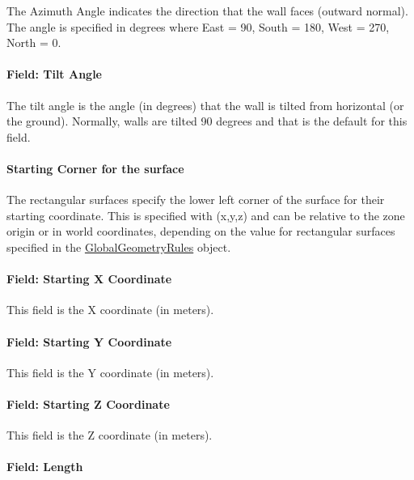 The Azimuth Angle indicates the direction that the wall faces (outward normal). The angle is specified in degrees where East = 90, South = 180, West = 270, North = 0.

\paragraph{Field: Tilt Angle}\label{field-tilt-angle-2}

The tilt angle is the angle (in degrees) that the wall is tilted from horizontal (or the ground). Normally, walls are tilted 90 degrees and that is the default for this field.

\paragraph{Starting Corner for the surface}\label{starting-corner-for-the-surface-2}

The rectangular surfaces specify the lower left corner of the surface for their starting coordinate. This is specified with (x,y,z) and can be relative to the zone origin or in world coordinates, depending on the value for rectangular surfaces specified in the \hyperref[globalgeometryrules]{GlobalGeometryRules} object.

\paragraph{Field: Starting X Coordinate}\label{field-starting-x-coordinate-2}

This field is the X coordinate (in meters).

\paragraph{Field: Starting Y Coordinate}\label{field-starting-y-coordinate-2}

This field is the Y coordinate (in meters).

\paragraph{Field: Starting Z Coordinate}\label{field-starting-z-coordinate-2}

This field is the Z coordinate (in meters).

\paragraph{Field: Length}\label{field-length-2}

